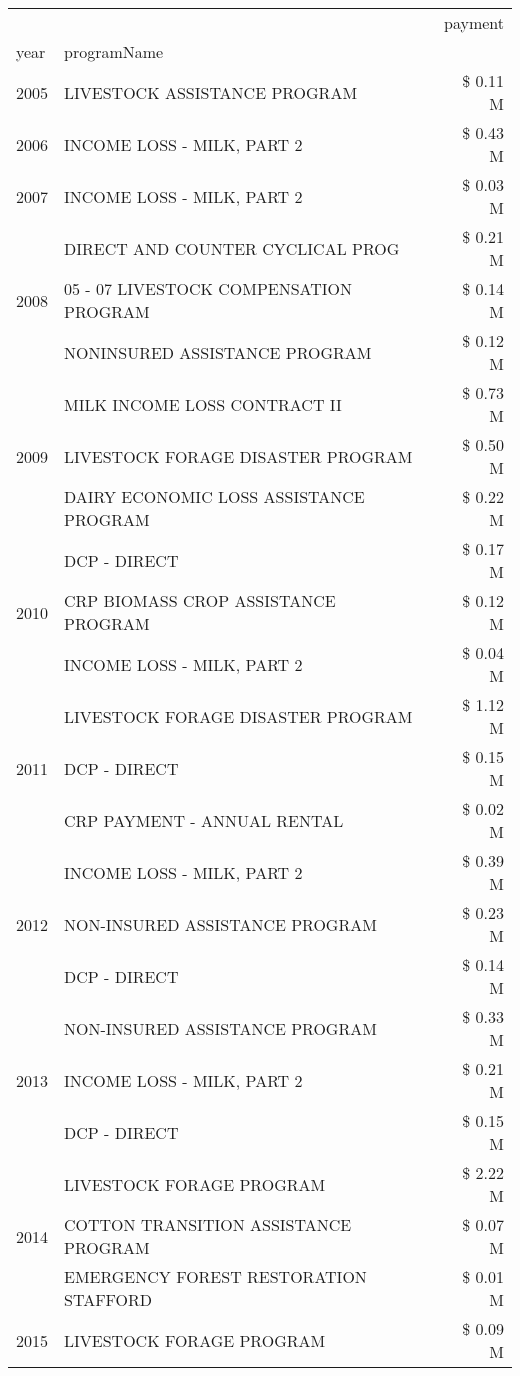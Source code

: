 \begin{tabular}{llr}
\toprule
 &  & payment \\
year & programName &  \\
\midrule
2005 & LIVESTOCK ASSISTANCE PROGRAM & \$ 0.11 M \\
\cline{1-3}
2006 & INCOME LOSS - MILK, PART 2 & \$ 0.43 M \\
\cline{1-3}
2007 & INCOME LOSS - MILK, PART 2 & \$ 0.03 M \\
\cline{1-3}
\multirow[t]{3}{*}{2008} & DIRECT AND COUNTER CYCLICAL PROG & \$ 0.21 M \\
 & 05 - 07 LIVESTOCK COMPENSATION PROGRAM & \$ 0.14 M \\
 & NONINSURED ASSISTANCE PROGRAM & \$ 0.12 M \\
\cline{1-3}
\multirow[t]{3}{*}{2009} & MILK INCOME LOSS CONTRACT II & \$ 0.73 M \\
 & LIVESTOCK FORAGE DISASTER  PROGRAM & \$ 0.50 M \\
 & DAIRY ECONOMIC LOSS ASSISTANCE PROGRAM & \$ 0.22 M \\
\cline{1-3}
\multirow[t]{3}{*}{2010} & DCP - DIRECT & \$ 0.17 M \\
 & CRP BIOMASS CROP ASSISTANCE PROGRAM & \$ 0.12 M \\
 & INCOME LOSS - MILK, PART 2 & \$ 0.04 M \\
\cline{1-3}
\multirow[t]{3}{*}{2011} & LIVESTOCK FORAGE DISASTER PROGRAM & \$ 1.12 M \\
 & DCP - DIRECT & \$ 0.15 M \\
 & CRP PAYMENT - ANNUAL RENTAL & \$ 0.02 M \\
\cline{1-3}
\multirow[t]{3}{*}{2012} & INCOME LOSS - MILK, PART 2 & \$ 0.39 M \\
 & NON-INSURED ASSISTANCE PROGRAM & \$ 0.23 M \\
 & DCP - DIRECT & \$ 0.14 M \\
\cline{1-3}
\multirow[t]{3}{*}{2013} & NON-INSURED ASSISTANCE PROGRAM & \$ 0.33 M \\
 & INCOME LOSS - MILK, PART 2 & \$ 0.21 M \\
 & DCP - DIRECT & \$ 0.15 M \\
\cline{1-3}
\multirow[t]{3}{*}{2014} & LIVESTOCK FORAGE PROGRAM & \$ 2.22 M \\
 & COTTON TRANSITION ASSISTANCE PROGRAM & \$ 0.07 M \\
 & EMERGENCY FOREST RESTORATION STAFFORD & \$ 0.01 M \\
\cline{1-3}
\multirow[t]{3}{*}{2015} & LIVESTOCK FORAGE PROGRAM & \$ 0.09 M \\

\end{tabular}

